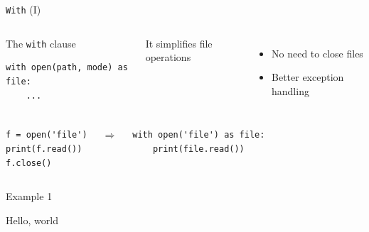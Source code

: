 \documentclass[10pt,compress]{beamer} %
\begin{document}
\begin{frame}[fragile]{\texttt{With} (I)}
	\begin{columns}
	\begin{block}{The \texttt{with} clause}
	\vspace{-0.2cm}
\begin{verbatim}
with open(path, mode) as file:
    ...
\end{verbatim}
	\end{block}


	It simplifies file operations
	\begin{itemize}
	\item No need to close files
    \item Better exception handling
	\end{itemize}
    \end{columns}

    
	\begin{columns}
	\begin{exampleblock}{}
	\begin{verbatim}
f = open('file')
print(f.read())
f.close()
\end{verbatim}
    \end{exampleblock}

    $\Rightarrow$

	\begin{exampleblock}{}
	\begin{verbatim}
with open('file') as file:
    print(file.read())
\end{verbatim}
    \end{exampleblock}

    \end{columns}
\end{frame}

\begin{frame}[fragile]{Example 1}
	\begin{exampleblock}{Hello, world}
	\vspace{-0.2cm}
	
	\vspace{-0.2cm}
	\end{exampleblock}
\end{frame}
\end{document}
